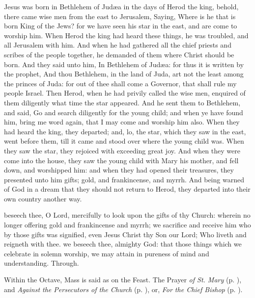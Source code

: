  Jesus was born in Bethlehem of Jud{\ae}a in the days of Herod the king, behold, there came wise men from the east to Jerusalem, Saying, Where is he that is born King of the Jews? for we have seen his star in the east, and are come to worship him. When Herod the king had heard these things, he was troubled, and all Jerusalem with him. And when he had gathered all the chief priests and scribes of the people together, he demanded of them where Christ should be born. And they said unto him, In Bethlehem of Jud{\ae}a: for thus it is written by the prophet, And thou Bethlehem, in the land of Juda, art not the least among the princes of Juda: for out of thee shall come a Governor, that shall rule my people Israel. Then Herod, when he had privily called the wise men, enquired of them diligently what time the star appeared. And he sent them to Bethlehem, and said, Go and search diligently for the young child; and when ye have found him, bring me word again, that I may come and worship him also. When they had heard the king, they departed; and, lo, the star, which they saw in the east, went before them, till it came and stood over where the young child was. When they saw the star, they rejoiced with exceeding great joy. And when they were come into the house, they saw the young child with Mary his mother,  and fell down, and worshipped him: and when they had opened their treasures, they presented unto him gifts; gold, and frankincense, and myrrh. And being warned of God in a dream that they should not return to Herod, they departed into their own country another way.

\secret\label{EpiphanyMassSecret}
 beseech thee, O Lord, mercifully to look upon the gifts of thy Church: wherein no longer offering gold and frankincense and myrrh; we sacrifice and receive him who by those gifts was signified, even Jesus Christ thy Son our Lord; Who liveth and reigneth with thee.
\postcommunion\label{EpiphanyMassPostcommunion}
 we beseech thee, almighty God: that those things which we celebrate in solemn worship, we may attain in pureness of mind and understanding. Through.
\begin{rubric}
    Within the Octave, Mass is said as on the Feast. The  Prayer \emph{of St. Mary} (p. \pageref{SPMaryPostChristmas}), and  \emph{Against the Persecutors of the Church} (p. \pageref{SPAgainst}), or, \emph{For the Chief Bishop} (p. \pageref{SPChiefBishop}).
\end{rubric}

